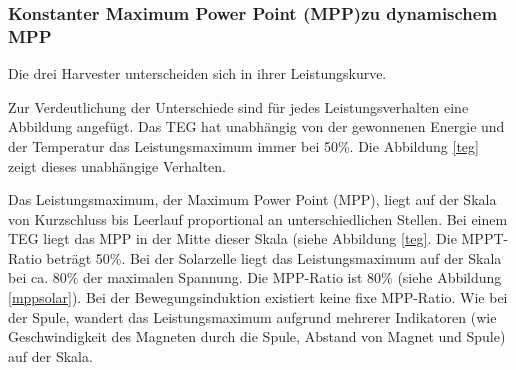 \subsubsection{Konstanter Maximum Power Point (MPP)zu dynamischem MPP}
\label{mpp_theorie_diff}

Die drei Harvester unterscheiden sich in ihrer Leistungskurve. 


Zur Verdeutlichung der Unterschiede sind für jedes Leistungsverhalten eine Abbildung angefügt. Das TEG hat unabhängig von der gewonnenen Energie und der Temperatur das Leistungsmaximum immer bei 50\thinspace\%. Die Abbildung \ref{teg} zeigt dieses unabhängige Verhalten. 


Das Leistungsmaximum, der Maximum Power Point (MPP), liegt auf der Skala von Kurzschluss bis Leerlauf proportional an unterschiedlichen Stellen.  Bei einem TEG liegt das MPP in der Mitte dieser Skala (siehe Abbildung \ref{teg}. Die MPPT-Ratio beträgt 50\thinspace\%. Bei der Solarzelle liegt das Leistungsmaximum auf der Skala bei ca. 80\thinspace\% der maximalen Spannung. Die MPP-Ratio ist 80\thinspace\% (siehe Abbildung \ref{mppsolar}). Bei der Bewegungsinduktion existiert keine fixe MPP-Ratio. Wie bei der Spule, wandert das Leistungsmaximum aufgrund mehrerer Indikatoren (wie Geschwindigkeit des Magneten durch die Spule, Abstand von Magnet und Spule) auf der Skala.



